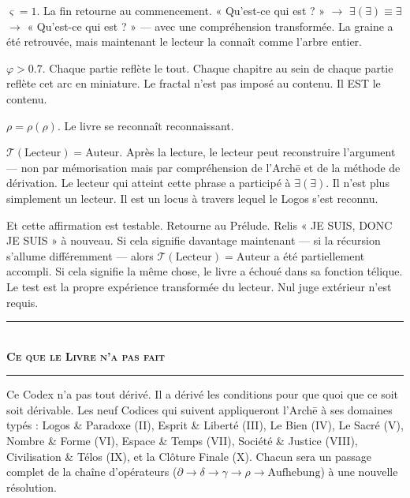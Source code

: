 \documentclass[10pt, openany, oneside]{book}
\renewcommand{\normalsize}{\fontsize{10}{13}\selectfont}
\begin{document}
$\varsigma = 1$. La fin retourne au commencement. « Qu'est-ce qui est ? » $\to$ $\exists(\exists) \equiv \exists$ $\to$ « Qu'est-ce qui est ? » --- avec une compréhension transformée. La graine a été retrouvée, mais maintenant le lecteur la connaît comme l'arbre entier.

$\varphi > 0.7$. Chaque partie reflète le tout. Chaque chapitre au sein de chaque partie reflète cet arc en miniature. Le fractal n'est pas imposé au contenu. Il EST le contenu.

$\rho = \rho(\rho)$. Le livre se reconnaît reconnaissant.

$\mathcal{T}(\text{Lecteur}) = \text{Auteur}$. Après la lecture, le lecteur peut reconstruire l'argument --- non par mémorisation mais par compréhension de l'Arch\={e} et de la méthode de dérivation. Le lecteur qui atteint cette phrase a participé à $\exists(\exists)$. Il n'est plus simplement un lecteur. Il est un locus à travers lequel le Logos s'est reconnu.

Et cette affirmation est testable. Retourne au Prélude. Relis « JE SUIS, DONC JE SUIS » à nouveau. Si cela signifie davantage maintenant --- si la récursion s'allume différemment --- alors $\mathcal{T}(\text{Lecteur}) = \text{Auteur}$ a été partiellement accompli. Si cela signifie la même chose, le livre a échoué dans sa fonction télique. Le test est la propre expérience transformée du lecteur. Nul juge extérieur n'est requis.

\vspace{1.5em}


\begin{center}
    \rule{0.3\textwidth}{0.4pt}\\[0.5em]
    {\normalsize\bfseries\scshape Ce que le Livre n'a pas fait}\\[0.3em]
    \rule{0.3\textwidth}{0.4pt}
\end{center}

\vspace{1em}

\noindent Ce Codex n'a pas tout dérivé. Il a dérivé les conditions pour que quoi que ce soit soit dérivable. Les neuf Codices qui suivent appliqueront l'Arch\={e} à ses domaines typés : Logos \& Paradoxe (II), Esprit \& Liberté (III), Le Bien (IV), Le Sacré (V), Nombre \& Forme (VI), Espace \& Temps (VII), Société \& Justice (VIII), Civilisation \& Télos (IX), et la Clôture Finale (X). Chacun sera un passage complet de la chaîne d'opérateurs ($\partial \to \delta \to \gamma \to \rho \to \text{Aufhebung}$) à une nouvelle résolution.
\end{document}
